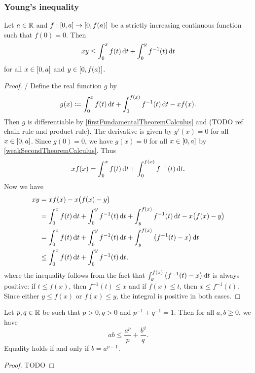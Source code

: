 \subsubsection{Young's inequality}
\begin{theorem}
Let $a\in \mathbb{R}$ and $f: \interval{0,a}\to \interval{0,f(a)}$ be a strictly increasing continuous function such that $f(0) = 0$. Then
\[ xy \leq \int_0^x f(t)\operatorname{d \!}{t} + \int_0^y f^{-1}(t)\operatorname{d \!}{t} \]
for all $x\in \interval{0,a}$ and $y\in \interval{0,f(a)}$.
\end{theorem}
\begin{proof}/
Define the real function $g$ by
\[ g(x) \coloneqq \int_0^x f(t)\operatorname{d \!}{t} + \int_0^{f(x)}f^{-1}(t)\operatorname{d \!}{t} - xf(x). \]
Then $g$ is differentiable by \ref{firstFundamentalTheoremCalculus} and (TODO ref chain rule and product rule). The derivative is given by $g'(x) = 0$ for all $x\in \interval{0,a}$. Since $g(0) = 0$, we have $g(x) = 0$ for all $x\in\interval{0,a}$ by \ref{weakSecondTheoremCalculus}. Thus
\[ xf(x) = \int_0^x f(t)\operatorname{d \!}{t} + \int_0^{f(x)}f^{-1}(t)\operatorname{d \!}{t}. \]
Now we have
\begin{align*}
xy &= xf(x) - x\big(f(x)-y\big) \\
&= \int_0^x f(t)\diff{t} + \int_0^{y}f^{-1}(t)\diff{t} + \int_y^{f(x)}f^{-1}(t)\diff{t} - x\big(f(x)-y\big) \\
&= \int_0^x f(t)\diff{t} + \int_0^{y}f^{-1}(t)\diff{t} + \int_y^{f(x)}\big(f^{-1}(t) - x\big)\diff{t} \\
&\leq \int_0^x f(t)\diff{t} + \int_0^{y}f^{-1}(t)\diff{t},
\end{align*}
where the inequality follows from the fact that $\int_y^{f(x)}\big(f^{-1}(t) - x\big)\operatorname{d \!}{t}$ is always positive: if $t \leq f(x)$, then $f^{-1}(t)\leq x$ and if $f(x)\leq t$, then $x\leq f^{-1}(t)$. Since either $y\leq f(x)$ or $f(x)\leq y$, the integral is positive in both cases.
\end{proof}
\begin{corollary} \label{YoungsInequality}
Let $p,q\in \mathbb{R}$ be such that $p>0, q>0$ and $p^{-1} + q^{-1} = 1$. Then for all $a,b \geq 0$, we have
\[ ab \leq \frac{a^p}{p} + \frac{b^q}{q}. \]
Equality holds \textup{if and only if} $b = a^{p-1}$.
\end{corollary}
\begin{proof}
TODO
\end{proof}
